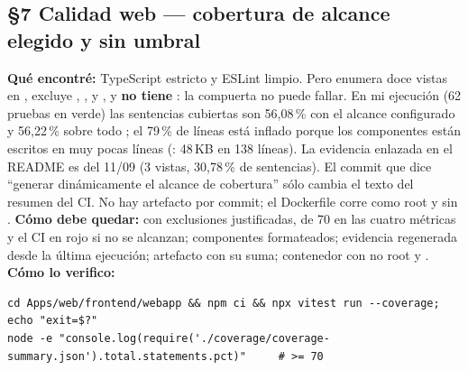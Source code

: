 \subsection*{\S7 Calidad web --- cobertura de alcance elegido y sin umbral}
\textbf{Qu\'e encontr\'e:} TypeScript estricto y ESLint limpio. Pero  enumera doce vistas en , excluye , ,  y , y \textbf{no tiene }: la compuerta no puede fallar. En mi ejecuci\'on (62 pruebas en verde) las sentencias cubiertas son 56,08\,\% con el alcance configurado y 56,22\,\% sobre todo ; el 79\,\% de l\'ineas est\'a inflado porque los componentes est\'an escritos en muy pocas l\'ineas (: 48\,KB en 138 l\'ineas). La evidencia enlazada en el README es del 11/09 (3 vistas, 30,78\,\% de sentencias). El commit que dice ``generar din\'amicamente el alcance de cobertura'' s\'olo cambia el texto del resumen del CI. No hay artefacto  por commit; el Dockerfile corre como root y sin . \textbf{C\'omo debe quedar:}  con exclusiones justificadas,  de 70 en las cuatro m\'etricas y el CI en rojo si no se alcanzan; componentes formateados; evidencia regenerada desde la \'ultima ejecuci\'on; artefacto  con su suma; contenedor con  no root y . \textbf{C\'omo lo verifico:}\begin{verbatim}
cd Apps/web/frontend/webapp && npm ci && npx vitest run --coverage; echo "exit=$?"
node -e "console.log(require('./coverage/coverage-summary.json').total.statements.pct)"     # >= 70
\end{verbatim}

